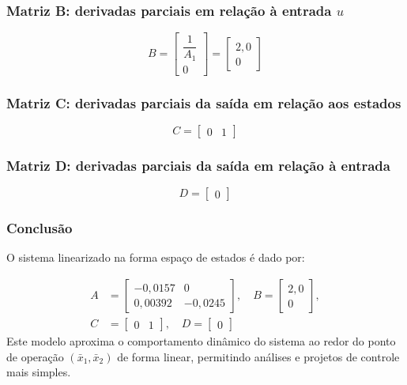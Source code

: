 \documentclass[12pt,a4]{article}
\begin{document}
\subsubsection*{Matriz B: derivadas parciais em relação à entrada \(u\)}

\begin{equation}
B = \begin{bmatrix}
\dfrac{1}{A_1} \\
0
\end{bmatrix}
=
\begin{bmatrix}
2{,}0 \\
0
\end{bmatrix}
\end{equation}

\subsubsection*{Matriz C: derivadas parciais da saída em relação aos estados}

\begin{equation}
C = \begin{bmatrix} 0 & 1 \end{bmatrix}
 \end{equation}

\subsubsection*{Matriz D: derivadas parciais da saída em relação à entrada}

\begin{equation}
D = \begin{bmatrix} 0 \end{bmatrix}
 \end{equation}

\subsubsection*{Conclusão}

O sistema linearizado na forma espaço de estados é dado por:

\begin{equation}
\begin{aligned}
A &= \begin{bmatrix}
-0{,}0157 & 0 \\
0{,}00392 & -0{,}0245
\end{bmatrix}, \quad
B = \begin{bmatrix}
2{,}0 \\
0
\end{bmatrix}, \\
C &= \begin{bmatrix} 0 & 1 \end{bmatrix}, \quad
D = \begin{bmatrix} 0 \end{bmatrix}
\end{aligned}
 \end{equation}
Este modelo aproxima o comportamento dinâmico do sistema ao redor do ponto de operação \((\bar{x}_1, \bar{x}_2)\) de forma linear, permitindo análises e projetos de controle mais simples.
\end{document}
